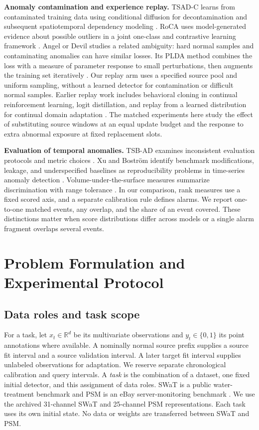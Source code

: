 \documentclass[pdflatex,sn-apa]{sn-jnl}
\begin{document}
\textbf{Anomaly contamination and experience replay.} TSAD-C learns from
contaminated training data using conditional diffusion for
decontamination and subsequent spatiotemporal dependency modeling
\citep{tsadc2025}. RoCA uses model-generated evidence about possible
outliers in a joint one-class and contrastive learning framework
\citep{roca2026}. Angel or Devil studies a related ambiguity: hard
normal samples and contaminating anomalies can have similar losses. Its
PLDA method combines the loss with a measure of parameter response to
small perturbations, then augments the training set iteratively
\citep{zhang2026plda}. Our replay arm uses a specified source pool and
uniform sampling, without a learned detector for contamination or
difficult normal samples. Earlier replay work includes behavioral
cloning in continual reinforcement learning, logit distillation, and
replay from a learned distribution for continual domain adaptation
\citep{rolnick2019, buzzega2020, rostami2021}. The matched experiments
here study the effect of substituting source windows at an equal update
budget and the response to extra abnormal exposure at fixed replacement
slots.

\textbf{Evaluation of temporal anomalies.} TSB-AD examines inconsistent
evaluation protocols and metric choices \citep{tsbad2024}. Xu and
Bostr\"{o}m identify benchmark modifications, leakage, and underspecified
baselines as reproducibility problems in time-series anomaly detection
\citep{xu2026methodology}. Volume-under-the-surface measures summarize
discrimination with range tolerance \citep{vus2025}. In our comparison,
rank measures use a fixed scored axis, and a separate calibration rule
defines alarms. We report one-to-one matched events, any overlap, and
the share of an event covered. These distinctions matter when score
distributions differ across models or a single alarm fragment overlaps
several events.

\section{Problem Formulation and Experimental
Protocol}\label{problem-formulation-and-experimental-protocol}

\subsection{Data roles and task scope}\label{data-roles-and-task-scope}

For a task, let \(x_t\in\mathbb{R}^d\) be its multivariate observations
and \(y_t\in\{0,1\}\) its point annotations where available. A nominally
normal source prefix supplies a source fit interval and a source
validation interval. A later target fit interval supplies unlabeled
observations for adaptation. We reserve separate chronological
calibration and query intervals. A \emph{task} is the combination of a
dataset, one fixed initial detector, and this assignment of data roles.
SWaT is a public water-treatment benchmark and PSM is an eBay
server-monitoring benchmark \citep{swat2016, psm2021}. We use the
archived 31-channel SWaT and 25-channel PSM representations. Each task
uses its own initial state. No data or weights are transferred between
SWaT and PSM.
\end{document}
